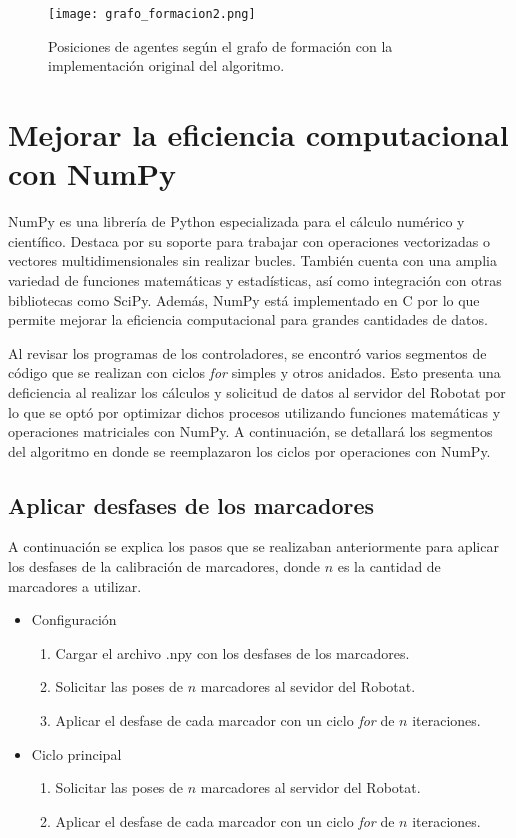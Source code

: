 \begin{figure}[H]
	\centering
	\texttt{[image: grafo\_formacion2.png]}
	\caption{Posiciones de agentes según el grafo de formación con la implementación original del algoritmo.}
	\label{fig:grafo_formacion2}
\end{figure}
	
\section{Mejorar la eficiencia computacional con NumPy}
NumPy es una librería de Python especializada para el cálculo numérico y científico. Destaca por su soporte para trabajar con operaciones vectorizadas o vectores multidimensionales sin realizar bucles. También cuenta con una amplia variedad de funciones matemáticas y estadísticas, así como integración con otras bibliotecas como SciPy. Además, NumPy está implementado en C por lo que permite mejorar la eficiencia computacional para grandes cantidades de datos.

Al revisar los programas de los controladores, se encontró varios segmentos de código que se realizan con ciclos \textit{for} simples y otros anidados. Esto presenta una deficiencia al realizar los cálculos y solicitud de datos al servidor del Robotat por lo que se optó por optimizar dichos procesos utilizando funciones matemáticas y operaciones matriciales con NumPy. A continuación, se detallará los segmentos del algoritmo en donde se reemplazaron los ciclos  por operaciones con NumPy.

\subsection{Aplicar desfases de los marcadores}
A continuación se explica los pasos que se realizaban anteriormente para aplicar los desfases de la calibración de marcadores, donde $n$ es la cantidad de marcadores a utilizar.


\begin{itemize}
	\item Configuración
	\begin{enumerate}
		\item Cargar el archivo .npy con los desfases de los marcadores.
		\item Solicitar las poses de $n$ marcadores al sevidor del Robotat.
		\item Aplicar el desfase de cada marcador con un ciclo \textit{for} de $n$ iteraciones.
	\end{enumerate}
	\item Ciclo principal 
	\begin{enumerate}
		\item Solicitar las poses de $n$ marcadores al servidor del Robotat.
		\item Aplicar el desfase de cada marcador con un ciclo \textit{for} de $n$ iteraciones.
	\end{enumerate}
\end{itemize}

